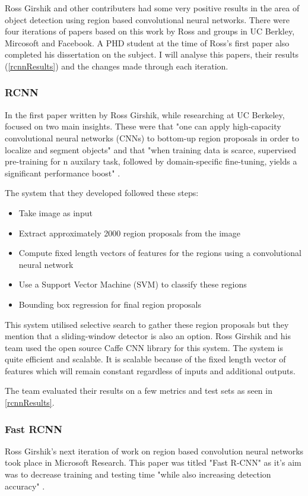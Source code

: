 Ross Girshik and other contributers had some very positive results in the area
of object detection using region based convolutional neural networks. There were
four iterations of papers based on this work by Ross and groups in UC Berkley,
Mircosoft and Facebook. A PHD student at the time of Ross's first paper also
completed his dissertation on the subject. I will analyse this papers, their
results (\ref{rcnnResults}) and the changes made through each iteration.

\subsubsection*{RCNN}
In the first paper written by Ross Girshik, while researching at UC Berkeley,
focused on two main insights. These were that "one can apply high-capacity convolutional neural networks (CNNs) to bottom-up region proposals in order to localize and segment objects" and that
"when training data is scarce, supervised pre-training for n auxilary task,
followed by domain-specific fine-tuning, yields a significant performance boost"
\textcite{rcnn}.

The system that they developed followed these steps:
\begin{itemize}
    \item{Take image as input}
    \item{Extract approximately 2000 region proposals from the image}
    \item{Compute fixed length vectors of features for the regions using a convolutional
        neural network}
    \item{Use a Support Vector Machine (SVM) to classify these regions}
    \item{Bounding box regression for final region proposals}
\end{itemize}

This system utilised selective search to gather these region proposals but they
mention that a sliding-window detector is also an option. Ross Girshik and his
team used the open source Caffe CNN library for this system. The system is quite
efficient and scalable. It is scalable because of the fixed length vector of
features which will remain constant regardless of inputs and additional outputs.

The team evaluated their results on a few metrics and test sets as seen in
\ref{rcnnResults}.

\subsubsection*{Fast RCNN}
Ross Girshik's next iteration of work on region based convolution neural
networks took place in Microsoft Research. This paper was titled "Fast R-CNN" as
it's aim was to decrease training and testing time "while also increasing
detection accuracy" \textcite{fastRcnn}.


